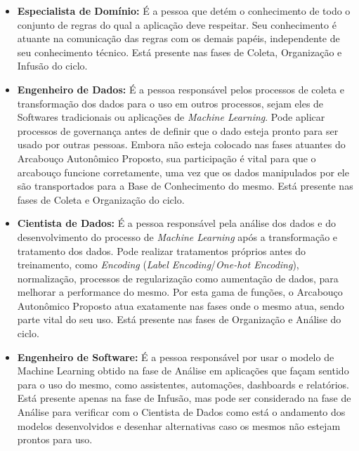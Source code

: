 \documentclass[portugues]{ic-tese}
\begin{document}
\begin{itemize}
\item \textbf{Especialista de Domínio:} É a pessoa que detém o conhecimento de todo o conjunto de regras do qual a aplicação deve respeitar. Seu conhecimento é atuante na comunicação das regras com os demais papéis, independente de seu conhecimento técnico. Está presente nas fases de Coleta, Organização e Infusão do ciclo.

\item \textbf{Engenheiro de Dados:} É a pessoa responsável pelos processos de coleta e transformação dos dados para o uso em outros processos, sejam eles de Softwares tradicionais ou aplicações de \textit{Machine Learning}. Pode aplicar processos de governança antes de definir que o dado esteja pronto para ser usado por outras pessoas. Embora não esteja colocado nas fases atuantes do Arcabouço Autonômico Proposto, sua participação é vital para que o arcabouço funcione corretamente, uma vez que os dados manipulados por ele são transportados para a Base de Conhecimento do mesmo. Está presente nas fases de Coleta e Organização do ciclo.

\item \textbf{Cientista de Dados:} É a pessoa responsável pela análise dos dados e do desenvolvimento do processo de \textit{Machine Learning} após a transformação e tratamento dos dados. Pode realizar tratamentos próprios antes do treinamento, como \textit{Encoding} (\textit{Label Encoding}/\textit{One-hot Encoding}), normalização, processos de regularização como aumentação de dados, para melhorar a performance do mesmo. Por esta gama de funções, o Arcabouço Autonômico Proposto atua exatamente nas fases onde o mesmo atua, sendo parte vital do seu uso. Está presente nas fases de Organização e Análise do ciclo.

\item \textbf{Engenheiro de Software:} É a pessoa responsável por usar o modelo de Machine Learning obtido na fase de Análise em aplicações que façam sentido para o uso do mesmo, como assistentes, automações, dashboards e relatórios. Está presente apenas na fase de Infusão, mas pode ser considerado na fase de Análise para verificar com o Cientista de Dados como está o andamento dos modelos desenvolvidos e desenhar alternativas caso os mesmos não estejam prontos para uso.
\end{itemize}
\end{document}
